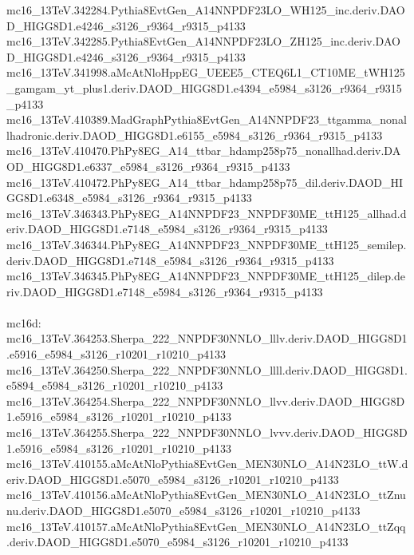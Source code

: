 \begin{footnotesize}
mc16\_13TeV.342284.Pythia8EvtGen\_A14NNPDF23LO\_WH125\_inc.deriv.DAOD\_HIGG8D1.e4246\_s3126\_r9364\_r9315\_p4133 \\
mc16\_13TeV.342285.Pythia8EvtGen\_A14NNPDF23LO\_ZH125\_inc.deriv.DAOD\_HIGG8D1.e4246\_s3126\_r9364\_r9315\_p4133 \\
mc16\_13TeV.341998.aMcAtNloHppEG\_UEEE5\_CTEQ6L1\_CT10ME\_tWH125\_gamgam\_yt\_plus1.deriv.DAOD\_HIGG8D1.e4394\_e5984\_s3126\_r9364\_r9315\_p4133 \\
mc16\_13TeV.410389.MadGraphPythia8EvtGen\_A14NNPDF23\_ttgamma\_nonallhadronic.deriv.DAOD\_HIGG8D1.e6155\_e5984\_s3126\_r9364\_r9315\_p4133 \\
mc16\_13TeV.410470.PhPy8EG\_A14\_ttbar\_hdamp258p75\_nonallhad.deriv.DAOD\_HIGG8D1.e6337\_e5984\_s3126\_r9364\_r9315\_p4133 \\
mc16\_13TeV.410472.PhPy8EG\_A14\_ttbar\_hdamp258p75\_dil.deriv.DAOD\_HIGG8D1.e6348\_e5984\_s3126\_r9364\_r9315\_p4133 \\
mc16\_13TeV.346343.PhPy8EG\_A14NNPDF23\_NNPDF30ME\_ttH125\_allhad.deriv.DAOD\_HIGG8D1.e7148\_e5984\_s3126\_r9364\_r9315\_p4133 \\
mc16\_13TeV.346344.PhPy8EG\_A14NNPDF23\_NNPDF30ME\_ttH125\_semilep.deriv.DAOD\_HIGG8D1.e7148\_e5984\_s3126\_r9364\_r9315\_p4133 \\
mc16\_13TeV.346345.PhPy8EG\_A14NNPDF23\_NNPDF30ME\_ttH125\_dilep.deriv.DAOD\_HIGG8D1.e7148\_e5984\_s3126\_r9364\_r9315\_p4133 \\
 \\
mc16d: \\
mc16\_13TeV.364253.Sherpa\_222\_NNPDF30NNLO\_lllv.deriv.DAOD\_HIGG8D1.e5916\_e5984\_s3126\_r10201\_r10210\_p4133 \\
mc16\_13TeV.364250.Sherpa\_222\_NNPDF30NNLO\_llll.deriv.DAOD\_HIGG8D1.e5894\_e5984\_s3126\_r10201\_r10210\_p4133 \\
mc16\_13TeV.364254.Sherpa\_222\_NNPDF30NNLO\_llvv.deriv.DAOD\_HIGG8D1.e5916\_e5984\_s3126\_r10201\_r10210\_p4133 \\
mc16\_13TeV.364255.Sherpa\_222\_NNPDF30NNLO\_lvvv.deriv.DAOD\_HIGG8D1.e5916\_e5984\_s3126\_r10201\_r10210\_p4133 \\
mc16\_13TeV.410155.aMcAtNloPythia8EvtGen\_MEN30NLO\_A14N23LO\_ttW.deriv.DAOD\_HIGG8D1.e5070\_e5984\_s3126\_r10201\_r10210\_p4133 \\
mc16\_13TeV.410156.aMcAtNloPythia8EvtGen\_MEN30NLO\_A14N23LO\_ttZnunu.deriv.DAOD\_HIGG8D1.e5070\_e5984\_s3126\_r10201\_r10210\_p4133 \\
mc16\_13TeV.410157.aMcAtNloPythia8EvtGen\_MEN30NLO\_A14N23LO\_ttZqq.deriv.DAOD\_HIGG8D1.e5070\_e5984\_s3126\_r10201\_r10210\_p4133 \\

\end{footnotesize}
